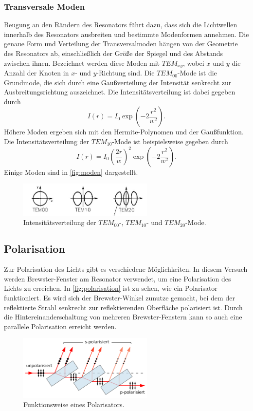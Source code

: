 \subsubsection{Transversale Moden}\label{sec:transversalemoden}
Beugung an den Rändern des Resonators führt dazu, dass sich die Lichtwellen innerhalb des Resonators ausbreiten und bestimmte Modenformen annehmen.
Die genaue Form und Verteilung der Transversalmoden hängen von der Geometrie des Resonators ab, einschließlich der Größe der Spiegel und des Abstands zwischen ihnen.
Bezeichnet werden diese Moden mit $TEM_{xy}$, wobei $x$ und $y$ die Anzahl der Knoten in $x$- und $y$-Richtung sind. Die $TEM_{00}$-Mode ist die Grundmode, die sich durch eine Gaußverteilung
der Intensität senkrecht zur Ausbreitungsrichtung auszeichnet. Die Intensitätsverteilung ist dabei gegeben durch
\begin{equation*}
    I(r) = I_0 \exp\left(-2\frac{r^2}{w^2}\right).
\end{equation*}
Höhere Moden ergeben sich mit den Hermite-Polynomen und der Gaußfunktion. Die Intensitätsverteilung der $TEM_{10}$-Mode ist beispielsweise gegeben durch
\begin{equation*}
    I(r) = I_0 \left(\frac{2r}{w}\right)^2 \exp\left(-2\frac{r^2}{w^2}\right).
\end{equation*}
Einige Moden sind in \autoref{fig:moden} dargestellt.
\begin{figure}[H]
    \centering
    \includegraphics[width=0.6\textwidth]{grafiken/tem.jpg}
    \caption{Intensitätsverteilung der $TEM_{00}$-, $TEM_{10}$- und $TEM_{20}$-Mode.\cite{eichler}}
    \label{fig:moden}
\end{figure}
\subsection{Polarisation}\label{sec:polarisation}
Zur Polarisation des Lichts gibt es verschiedene Möglichkeiten. In diesem Versuch werden Brewster-Fenster am Resonator verwendet, um eine Polarisation des Lichts zu erreichen.
In \autoref{fig:polarisation} ist zu sehen, wie ein Polarisator funktioniert. Es wird sich der Brewster-Winkel zunutze gemacht, bei dem der reflektierte Strahl senkrecht zur reflektierenden
Oberfläche polarisiert ist. Durch die Hintereinanderschaltung von mehreren Brewster-Fenstern kann so auch eine parallele Polarisation erreicht werden.
\begin{figure}[H]
    \centering
    \includegraphics[width=0.6\textwidth]{grafiken/brewster.png}
    \caption{Funktionsweise eines Polarisators.\cite{brewster}}
    \label{fig:polarisation}
\end{figure}
